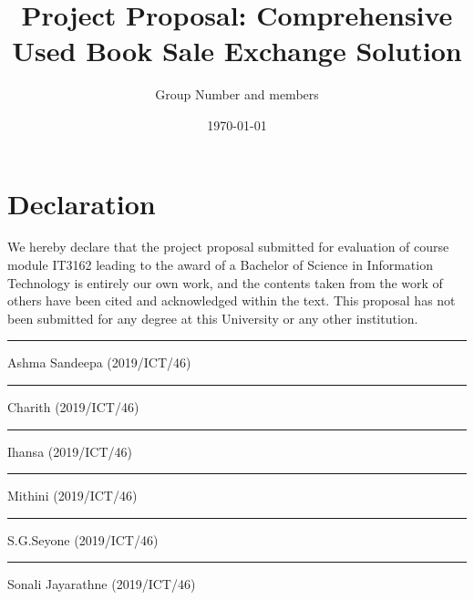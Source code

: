 \documentclass{article}
\begin{document}
\title{Project Proposal: Comprehensive Used Book Sale Exchange Solution}
\author{Group Number and members}
\date{ \today }
\maketitle

\newpage

\section*{Declaration}
We hereby declare that the project proposal submitted for evaluation of
course module IT3162 leading to the award of a Bachelor of Science in
Information Technology is entirely our own work, and the contents taken from
the work of others have been cited and acknowledged within the text. This
proposal has not been submitted for any degree at this University or any other
institution.

\vspace{2cm} %
\rule{5cm}{0.5pt} %
\linebreak
Ashma Sandeepa (2019/ICT/46)

\vspace{2cm} %
\rule{5cm}{0.5pt} %
\linebreak
Charith (2019/ICT/46)

\vspace{2cm} %
\rule{5cm}{0.5pt} %
\linebreak
Ihansa (2019/ICT/46)

\vspace{2cm} %
\rule{5cm}{0.5pt} %
\linebreak
Mithini (2019/ICT/46)

\vspace{2cm} %
\rule{5cm}{0.5pt} %
\linebreak
S.G.Seyone (2019/ICT/46)

\vspace{2cm} %
\rule{5cm}{0.5pt} %
\linebreak
Sonali Jayarathne (2019/ICT/46)
\end{document}
